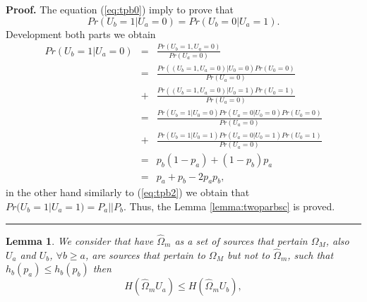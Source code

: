 \documentclass[a4paper,10pt]{article}
\newtheorem{mylemma}[mytheorem]{Lemma}
\newenvironment{myproof}[1][Proof]{\textbf{#1.} }{\ \rule{0.5em}{0.5em}}
\begin{document}
\begin{myproof}
\label{proof:twoparbsc}
The equation (\ref{eq:tpb0}) imply to prove that 
\begin{equation} \label{eq:tpb1}
Pr(U_b=1|U_a=0)=Pr(U_b=0|U_a=1).
\end{equation}
Development both parts we obtain
\small
\begin{equation} \label{eq:tpb2}
\begin{matrix}
Pr(U_b=1|U_a=0) & = & \frac{Pr(U_b=1,U_a=0)}{Pr(U_a=0)}\\ 
 ~              & = & \frac{Pr((U_b=1,U_a=0)|U_0=0)Pr(U_0=0)}{Pr(U_a=0)}\\ 
 ~              & + & \frac{Pr((U_b=1,U_a=0)|U_0=1)Pr(U_0=1)}{Pr(U_a=0)}\\
 ~              & = & \frac{Pr(U_b=1|U_0=0)Pr(U_a=0|U_0=0)Pr(U_0=0)}{Pr(U_a=0)}\\ 
 ~              & + & \frac{Pr(U_b=1|U_0=1)Pr(U_a=0|U_0=1)Pr(U_0=1)}{Pr(U_a=0)}\\
 ~              & = & p_b(1-p_a)+(1-p_b)p_a\\ 
 ~              & = & p_a+p_b -2 p_a p_b,
\end{matrix}
\end{equation}
\normalsize
in the other hand similarly to (\ref{eq:tpb2}) we obtain that 
$Pr(U_b=1|U_a=1)=P_a || P_b$. Thus, the Lemma \ref{lemma:twoparbsc} is proved.
\end{myproof}
\begin{mdframed}[style=MDFStyGrayScreen]
\begin{mylemma}
\label{lemma:minimo}
We consider that have $\hat{\Omega}_{m}$ as a set of sources that pertain 
$\Omega_M$, also $U_{a}$ and $U_b$, $\forall b \geq {a}$, are sources that 
pertain to $\Omega_M$ but not to $\hat{\Omega}_{m}$, such that $ h_{b}(p_a) \leq h_{b}(p_b)$
then
\begin{equation}\label{eq:proof1}
 H(\hat{\Omega}_{m} U_{a} ) \leq H(\hat{\Omega}_{m} U_b ),
\end{equation}
\end{mylemma}
\end{mdframed}
\end{document}
